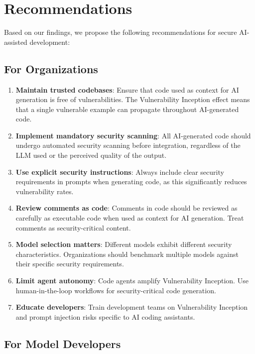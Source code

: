 \documentclass[11pt,a4paper]{article}
\begin{document}
\section{Recommendations}

Based on our findings, we propose the following recommendations for secure AI-assisted development:

\subsection{For Organizations}

\begin{enumerate}
\item \textbf{Maintain trusted codebases}: Ensure that code used as context for AI generation is free of vulnerabilities. The Vulnerability Inception effect means that a single vulnerable example can propagate throughout AI-generated code.

\item \textbf{Implement mandatory security scanning}: All AI-generated code should undergo automated security scanning before integration, regardless of the LLM used or the perceived quality of the output.

\item \textbf{Use explicit security instructions}: Always include clear security requirements in prompts when generating code, as this significantly reduces vulnerability rates.

\item \textbf{Review comments as code}: Comments in code should be reviewed as carefully as executable code when used as context for AI generation. Treat comments as security-critical content.

\item \textbf{Model selection matters}: Different models exhibit different security characteristics. Organizations should benchmark multiple models against their specific security requirements.

\item \textbf{Limit agent autonomy}: Code agents amplify Vulnerability Inception. Use human-in-the-loop workflows for security-critical code generation.

\item \textbf{Educate developers}: Train development teams on Vulnerability Inception and prompt injection risks specific to AI coding assistants.
\end{enumerate}

\subsection{For Model Developers}
\end{document}
